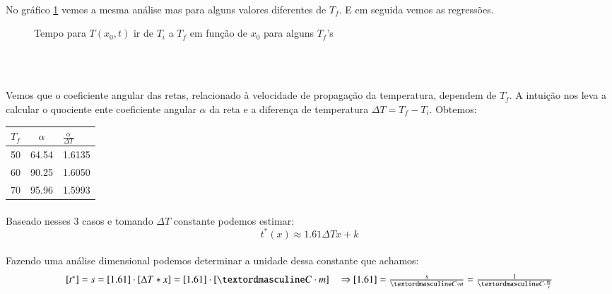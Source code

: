 \documentclass[a4paper,11pt]{article}
\begin{document}
\paragraph{}No gráfico \ref{graph:8-2} vemos a mesma análise mas para alguns valores diferentes de $T_f$. E em seguida vemos as regressões.
\FloatBarrier
\begin{figure}[!htp]
	
	\centering
	\caption{Tempo para $T(x_0, t)$ ir de $T_i$ a $T_f$ em função de $x_0$ para alguns $T_f$'s}
	\label{graph:8-2}
	\end{figure} 
\FloatBarrier
\begin{equation}
\begin{tabular}{l}
	$$ \\ 
	$$ \\
\end{tabular}
\end{equation}

\paragraph{}Vemos que o coeficiente angular das retas, relacionado à velocidade de propagação da temperatura,  dependem de $T_f$. A intuição nos leva a calcular o quociente ente coeficiente angular $\alpha$ da reta e a diferença de temperatura $\Delta T = T_f - T_i$. Obtemos:
	\begin{table}[!htp]
	\centering
		\begin{tabular}{|l|c|l|}\hline
			$T_f$ & $\alpha$ &  $\frac{\alpha}{\Delta T}$ \\ \hline		
			50 	& 64.54 & 1.6135 \\ \hline
			60 	& 90.25 & 1.6050 \\ \hline				
			70 	& 95.96 & 1.5993 \\ \hline	
		\end{tabular}
	\end{table}
\paragraph{}Baseado nesses 3 casos e tomando $\Delta T$ constante podemos estimar:
\begin{displaymath}
	t^*(x) \approx 1.61 \Delta T x +  k 
\end{displaymath}
\paragraph{}Fazendo uma análise dimensional podemos determinar a unidade dessa constante que achamos:
\begin{displaymath}
\begin{tabular}{ll}
	$[t^*] = s = [1.61]\cdot[\Delta T * x] = [1.61]\cdot [ºC \cdot m]$ & $\Rightarrow [1.61] = \frac{s}{ºC \cdot m} = \frac{1}{ºC \cdot \frac{m}{s}}$
\end{tabular}
\end{displaymath}
\end{document}
